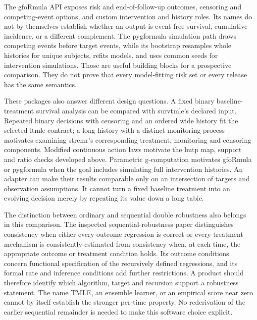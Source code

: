 The gfoRmula API exposes risk and end-of-follow-up outcomes, censoring and
competing-event options, and custom intervention and history roles. Its names
do not by themselves establish whether an output is event-free survival,
cumulative incidence, or a different complement. The pygformula simulation
path draws competing events before target events, while its bootstrap resamples
whole histories for unique subjects, refits models, and uses common seeds for
intervention simulations. Those are useful building blocks for a prospective
comparison. They do not prove that every model-fitting risk set or every
release has the same semantics.~\citep{sw_gformula,v13_sw_pygformula,v131_sw_pygformula}

These packages also answer different design questions. A fixed binary
baseline-treatment survival analysis can be compared with survtmle's
declared input. Repeated binary decisions with censoring and an ordered
wide history fit the selected ltmle contract; a long history with a distinct
monitoring process motivates examining stremr's corresponding treatment,
monitoring and censoring components. Modified continuous action laws motivate
the lmtp map, support and ratio checks developed above. Parametric
g-computation motivates gfoRmula or pygformula when the goal includes
simulating full intervention histories. An adapter can make their results
comparable only on an intersection of targets and observation assumptions.
It cannot turn a fixed baseline treatment into an evolving decision merely
by repeating its value down a long table.

The distinction between ordinary and sequential double robustness also
belongs in this comparison. The inspected sequential-robustness paper
distinguishes consistency when either every outcome regression is correct
or every treatment mechanism is consistently estimated from consistency
when, at each time, the appropriate outcome or treatment condition holds.
Its outcome conditions concern functional specification of the recursively
defined regressions, and its formal rate and inference conditions add
further restrictions. A product should therefore identify which algorithm,
target and recursion support a robustness statement. The name TMLE, an
ensemble learner, or an empirical score near zero cannot by itself establish
the stronger per-time property. No rederivation of the earlier sequential
remainder is needed to make this software choice explicit.
\citep{sequentialdr2018}


